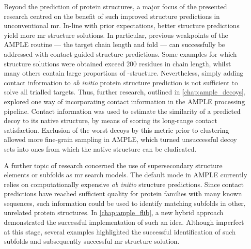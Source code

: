 Beyond the prediction of protein structures, a major focus of the presented research centred on the benefit of such improved structure predictions in unconventional \gls{mr}. In-line with prior expectations, better structure predictions yield more \gls{mr} structure solutions. In particular, previous weakpoints of the AMPLE routine --- the target chain length and fold --- can successfully be addressed with contact-guided structure predictions. Some examples for which structure solutions were obtained exceed 200 residues in chain length, whilst many others contain large proportions of \textbeta-structure. Nevertheless, simply adding contact information to \textit{ab initio} protein structure prediction is not sufficient to solve all trialled targets. Thus, further research, outlined in \cref{chap:ample_decoys}, explored one way of incorporating contact information in the AMPLE processing pipeline. Contact information was used to estimate the similarity of a predicted decoy to its native structure, by means of scoring its long-range contact satisfaction. Exclusion of the worst decoys by this metric prior to clustering allowed more fine-grain sampling in AMPLE, which turned unsuccessful decoy sets into ones from which the native structure can be eludicated.

A further topic of research concerned the use of supersecondary structure elements or subfolds as \gls{mr} search models. The default mode in AMPLE currently relies on computationally expensive \textit{ab initio} structure predictions. Since contact predictions have reached sufficient quality for protein families with many known sequences, such information could be used to identify matching subfolds in other, unrelated protein structures. In \cref{chap:ample_flib}, a new hybrid approach demonstrated the successful implementation of such an idea. Although imperfect at this stage, several examples highlighted the successful identification of such subfolds and subsequently successful \gls{mr} structure solution.

